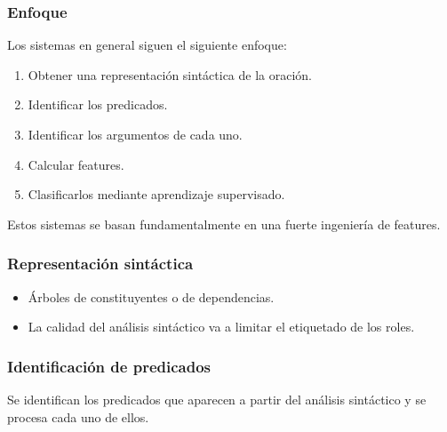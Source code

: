 \documentclass{beamer}
\begin{document}
\begin{frame}
  \frametitle{Enfoque}

  Los sistemas en general siguen el siguiente enfoque:

  \begin{enumerate}
    \item Obtener una representación sintáctica de la oración.
    \item Identificar los predicados.
    \item Identificar los argumentos de cada uno.
    \item Calcular features.
    \item Clasificarlos mediante aprendizaje supervisado.
  \end{enumerate}

  Estos sistemas se basan fundamentalmente en una fuerte ingeniería de features.
\end{frame}

\begin{frame}
  \frametitle{Representación sintáctica}

  \begin{itemize}
    \item Árboles de constituyentes o de dependencias.

    \item La calidad del análisis sintáctico va a limitar el etiquetado de los roles.
  \end{itemize}
\end{frame}

\begin{frame}
  \frametitle{Identificación de predicados}

  Se identifican los predicados que aparecen a partir del análisis sintáctico y se procesa cada uno de ellos.
\end{frame}
\end{document}
